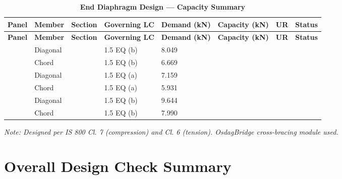 \documentclass[12pt,a4paper]{report}
\numberwithin{table}{chapter}
\numberwithin{figure}{chapter}
\begin{document}
\begin{longtable}{|C{2.0cm}|L{1.8cm}|C{2.2cm}|C{3.0cm}|C{1.8cm}|C{1.8cm}|C{1.2cm}|C{1.8cm}|}
\caption{\textbf{End Diaphragm Design --- Capacity Summary}}
\hline
\textbf{Panel} & \textbf{Member} & \textbf{Section} & \textbf{Governing LC} & \textbf{Demand (kN)} & \textbf{Capacity (kN)} & \textbf{UR} & \textbf{Status} \\[6pt]
\hline

\endfirsthead
\hline
\textbf{Panel} & \textbf{Member} & \textbf{Section} & \textbf{Governing LC} & \textbf{Demand (kN)} & \textbf{Capacity (kN)} & \textbf{UR} & \textbf{Status} \\[6pt]
\hline
\endhead
{} & Diagonal &  & 1.5 EQ (b) & 8.049 &  &  &  \\[6pt]
 & Chord &  & 1.5 EQ (b) & 6.669 &  &  &  \\[6pt]
\hline
{} & Diagonal &  & 1.5 EQ (a) & 7.159 &  &  &  \\[6pt]
 & Chord &  & 1.5 EQ (a) & 5.931 &  &  &  \\[6pt]
\hline
{} & Diagonal &  & 1.5 EQ (b) & 9.644 &  &  &  \\[6pt]
 & Chord &  & 1.5 EQ (b) & 7.990 &  &  &  \\[6pt]
\hline
\end{longtable}
\noindent\textit{Note: Designed per IS 800 Cl. 7 (compression) and Cl. 6 (tension). OsdagBridge cross-bracing module used.}

\section{Overall Design Check Summary}
\label{sec:overall-summary}
\end{document}
